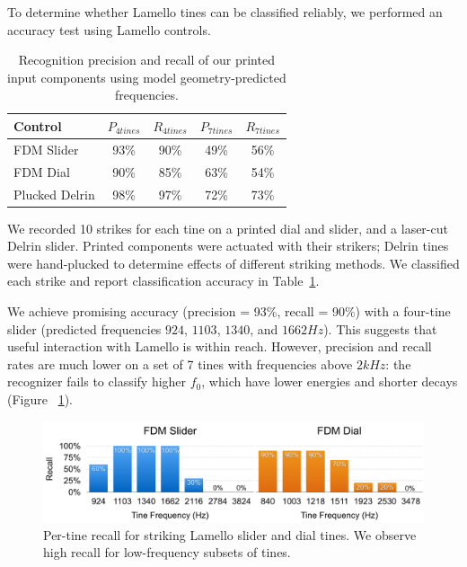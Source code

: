     To determine whether Lamello tines can be classified reliably, we performed an accuracy test using Lamello controls.

\begin{table}[b] 
  \begin{center}
  \small
  \begin{tabular}{ l || c | c || c | c }
  
Control & $P_{4tines}$ & $R_{4tines}$ & $P_{7tines}$ & $R_{7tines}$\\
\hline
FDM Slider & 93\% & 90\% & 49\% & 56\% \\  
FDM Dial & 90\% & 85\% & 63\% & 54\% \\  
Plucked Delrin & 98\% & 97\% & 72\% & 73\% \\
  \end{tabular}
  \end{center}
  \caption{Recognition precision and recall of our printed input components using model geometry-predicted frequencies.}
  \label{fig:lamello-recognition}
  \vspace{-0.1in}
\end{table}

We recorded 10 strikes for each tine on a printed dial and slider, and a laser-cut Delrin slider. Printed components were actuated with their strikers; Delrin tines were hand-plucked to determine effects of different striking methods. We classified each strike and report classification accuracy in Table~\ref{fig:lamello-recognition}.

We achieve promising accuracy (precision = 93\%, recall = 90\%) with a four-tine slider (predicted frequencies $924$, $1103$, $1340$, and $1662Hz$). This suggests that useful interaction with Lamello is within reach. However, precision and recall rates are much lower on a set of 7 tines with frequencies above $2kHz$: %
the recognizer fails to classify higher $f_0$, which have lower energies and shorter decays (Figure ~\ref{fig:lamello-recall_rates}).

\begin{figure}[t]
  \centering
    \includegraphics[width=\textwidth]{figures/lamello/fig6.pdf}
  \caption{Per-tine recall for striking Lamello slider and dial tines. We observe high recall for low-frequency subsets of tines.}
  \label{fig:lamello-recall_rates}
\end{figure}


